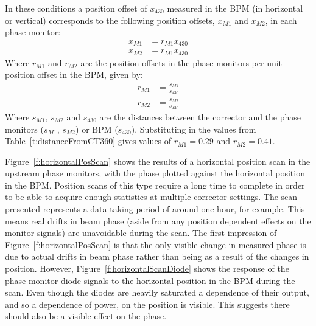 In these conditions a position offset of \(x_{430}\) measured in the BPM (in horizontal or vertical) corresponds to the following position offsets, \(x_{M1}\) and \(x_{M2}\), in each phase monitor:
\begin{align}
x_{M1} &= r_{M1}x_{430} \\
x_{M2} &= r_{M1}x_{430}
\end{align}
Where \(r_{M1}\) and \(r_{M2}\) are the position offsets in the phase monitors per unit position offset in the BPM, given by:
\begin{align}
r_{M1} &= \frac{s_{M1}}{s_{430}} \\
r_{M2} &= \frac{s_{M2}}{s_{430}}
\end{align}
Where \(s_{M1}\), \(s_{M2}\) and \(s_{430}\) are the distances between the corrector and the phase monitors (\(s_{M1}\), \(s_{M2}\)) or BPM (\(s_{430}\)). Substituting in the values from Table~\ref{t:distanceFromCT360} gives values of \(r_{M1} = 0.29\) and \(r_{M2} = 0.41\).

Figure~\ref{f:horizontalPosScan} shows the results of a horizontal position scan in the upstream phase monitors, with the phase plotted against the horizontal position in the BPM. Position scans of this type require a long time to complete in order to be able to acquire enough statistics at multiple corrector settings. The scan presented represents a data taking period of around one hour, for example. This means real drifts in beam phase (aside from any position dependent effects on the monitor signals) are unavoidable during the scan. The first impression of Figure~\ref{f:horizontalPosScan} is that the only visible change in measured phase is due to actual drifts in beam phase rather than being as a result of the changes in position. However, Figure~\ref{f:horizontalScanDiode} shows the response of the phase monitor diode signals to the horizontal position in the BPM during the scan. Even though the diodes are heavily saturated a dependence of their output, and so a dependence of power, on the position is visible. This suggests there should also be a visible effect on the phase.


